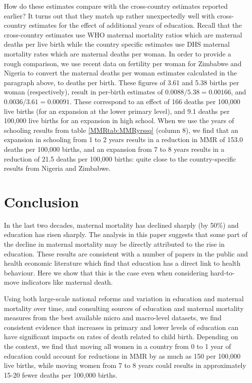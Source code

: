 \documentclass{article}[12pt,subeqn]
\begin{document}
\begin{spacing}{1.4}
How do these estimates compare with the cross-country estimates reported earlier? 
It turns out that they match up rather unexpectedly well with cross-country 
estimates for the effect of additional years of education. Recall that the 
cross-country estimates use WHO maternal mortality ratios which are maternal 
deaths per live birth while the country specific estimates use DHS maternal 
mortality rates which are maternal deaths per woman.  In order to provide a rough 
comparison, we use recent data \citep{CIA2012} on fertility per woman for Zimbabwe 
and Nigeria to convert the maternal deaths per woman estimates calculated in the 
paragraph above, to deaths per birth.  These figures of 3.61 and 5.38 births per 
woman (respectively), result in per-birth estimates of $0.0088/5.38=0.00166$, and 
$0.0036/3.61=0.00091$.  These correspond to an effect of 166 deaths per 100,000 
live births (for an expansion at the lower primary level), and 9.1 deaths per 
100,000 live births for an expansion in high school. When we use the years of 
schooling results from table \ref{MMRtab:MMRyrssq} (column 8), we find that an 
expansion in schooling from 1 to 2 years results in a reduction in MMR of 153.0 
deaths per 100,000 births, and an expansion from 7 to 8 years results in a 
reduction of 21.5 deaths per 100,000 births: quite close to the country-specific 
results from Nigeria and Zimbabwe.

\section{Conclusion}
In the last two decades, maternal mortality has declined sharply (by 50\%) and 
education has risen sharply. The analysis in this paper suggests that some part 
of the decline in maternal mortality may be directly attributed to the rise in
education.  These results are consistent with a number of papers in the public
and health economic literature which find that education has a direct link to
health behaviour. Here we show that this is the case even when considering
hard-to-move indicators like maternal death.

Using both large-scale national reforms and variation in education and maternal
mortality over time, and consulting sources of education and maternal mortality
measures from the best available micro and macro-level datasets, we find
consistent evidence that increases in primary and lower levels of education can
have significant impacts on rates of death related to child birth.  Depending on
the context, we find that moving all women in a country from 0 to 1 year of
education could account for reductions in MMR by as much as 150 per 100,000
live births, while moving women from 7 to 8 years could results in approximately
15-20 fewer deaths per 100,000 births.


\end{spacing}
\end{document}
